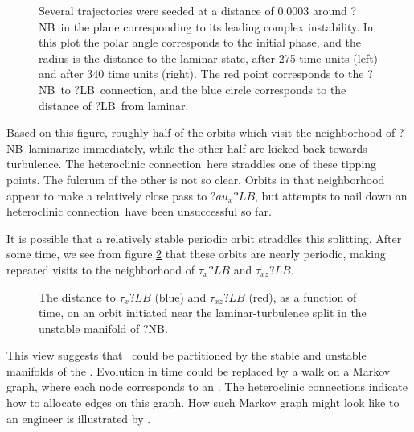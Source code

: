 \begin{figure}
\begin{center}
\end{center}
\caption[A visualization of the laminar basin boundary around ?NB.]
{Several trajectories were seeded at a distance of $0.0003$ around ?NB\ in
the plane corresponding to its leading complex instability.  In this
plot the polar angle corresponds to the initial phase, and the radius
is the distance to the laminar state, after 275 time units (left) and after
340 time units (right).
The red point corresponds to the ?NB\ to ?LB\ connection, and the
blue circle corresponds to the distance of ?LB\ from laminar.}
 \label{f:NB_turb_laminar_edge}
\end{figure}

Based on this figure, roughly half of the orbits which visit the neighborhood
of ?NB\ laminarize immediately, while the other half are kicked back towards
turbulence.  The heteroclinic connection\ here straddles one of these tipping points.
The fulcrum of the other is not so clear.  Orbits in that neighborhood appear
to make a relatively close pass to $?au_x ?LB$, but attempts to nail down
an heteroclinic connection\ have been unsuccessful so far.

It is possible that a relatively stable periodic orbit straddles this splitting.
After some time, we see from figure \ref{NBLB_split_series}
that these orbits are nearly periodic,
making repeated visits to the neighborhood of $\tau_x ?LB$ and $\tau_{xz} ?LB$.

\begin{figure}
\centering
\caption[A time series of indicating distance to ?LB.]
{The distance to $\tau_x ?LB$ (blue) and $\tau_{xz} ?LB$ (red), as a function
of time, on an orbit initiated near the laminar-turbulence split
in the unstable manifold of ?NB.}
\label{NBLB_split_series}
\end{figure}

This view suggests that \statesp\ could be partitioned by the stable
and unstable manifolds of the \eqva.  Evolution in time could be replaced by
a walk on a Markov graph, where each node corresponds to an \eqv.  The heteroclinic connections
indicate how to allocate edges on this graph.
How such Markov graph might
look like \ifboyscout to an engineer \fi
is illustrated by .

